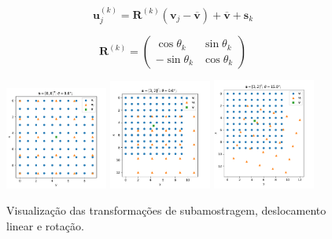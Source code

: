 \begin{equation}
	\label{eq:psfcenter}
	\mathbf{u}^{(k)}_j = \mathbf{R}^{(k)}(\mathbf{v}_j-\mathbf{\overline{v}})+\mathbf{\overline{v}}+\mathbf{s}_k
\end{equation}

\begin{equation}
	\mathbf{R}^{(k)} = 
	\begin{pmatrix}
		\cos \theta_k & \sin \theta_k \\
		- \sin \theta_k & \cos \theta_k
	\end{pmatrix}
\end{equation}

\begin{figure}
	\centering
	\includegraphics[width=0.3\textwidth]{./figures/transform1.pdf}
	\includegraphics[width=0.3\textwidth]{./figures/transform2.pdf}
	\includegraphics[width=0.3\textwidth]{./figures/transform3.pdf}
	\caption{Visualização das transformações de subamostragem, deslocamento linear e rotação.}
	\label{fig:transformations}
\end{figure}


